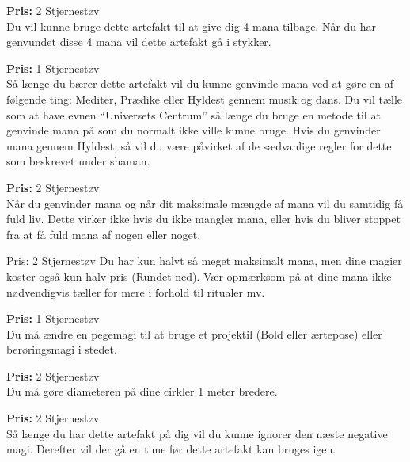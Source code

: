 \begin{artefakt*}
\textbf{Pris:} 2 Stjernestøv\\
Du vil kunne bruge dette artefakt til at give dig 4 mana tilbage. Når du har genvundet disse 4 mana vil dette artefakt gå i stykker.
\end{artefakt*}

\begin{artefakt*}
\textbf{Pris:} 1 Stjernestøv\\
Så længe du bærer dette artefakt vil du kunne genvinde mana ved at gøre en af følgende ting: Mediter, Prædike eller Hyldest gennem musik og dans. Du vil tælle som at have evnen “Universets Centrum” så længe du bruge en metode til at genvinde mana på som du normalt ikke ville kunne bruge. Hvis du genvinder mana gennem Hyldest, så vil du være påvirket af de sædvanlige regler for dette som beskrevet under shaman.
\end{artefakt*} 


\begin{artefakt*}
\textbf{Pris:} 2 Stjernestøv\\
Når du genvinder mana og når dit maksimale mængde af mana vil du samtidig få fuld liv. Dette virker ikke hvis du ikke mangler mana, eller hvis du bliver stoppet fra at få fuld mana af nogen eller noget.
\end{artefakt*}

\begin{artefakt*}
Pris: 2 Stjernestøv
Du har kun halvt så meget maksimalt mana, men dine magier koster også kun halv pris (Rundet ned). Vær opmærksom på at dine mana ikke nødvendigvis tæller for mere i forhold til ritualer mv.
\end{artefakt*}

\begin{artefakt*}
\textbf{Pris:} 1 Stjernestøv\\
Du må ændre en pegemagi til at bruge et projektil (Bold eller ærtepose) eller berøringsmagi i stedet.
\end{artefakt*}

\begin{artefakt*}
\textbf{Pris:} 2 Stjernestøv\\
Du må gøre diameteren på dine cirkler 1 meter bredere. 
\end{artefakt*}

\begin{artefakt*}
\textbf{Pris:} 2 Stjernestøv\\
Så længe du har dette artefakt på dig vil du kunne ignorer den næste negative magi. Derefter vil der gå en time før dette artefakt kan bruges igen.
\end{artefakt*}

